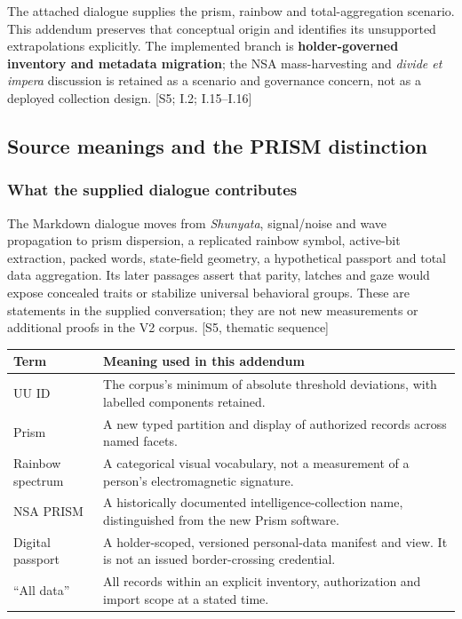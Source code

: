 \documentclass[11pt,a4paper]{article}
\newcommand{\newpagehead}[1]{\clearpage\subsection{#1}}
\newcommand{\source}[1]{{\sffamily\small\color{slate}[#1]}}
\begin{document}
The attached dialogue supplies the prism, rainbow and total-aggregation scenario. This addendum preserves that conceptual origin and identifies its unsupported extrapolations explicitly. The implemented branch is \textbf{holder-governed inventory and metadata migration}; the NSA mass-harvesting and \emph{divide et impera} discussion is retained as a scenario and governance concern, not as a deployed collection design. \source{S5; I.2; I.15--I.16}

\newpagehead{Source meanings and the PRISM distinction}
\subsubsection{What the supplied dialogue contributes}
The Markdown dialogue moves from \emph{Shunyata}, signal/noise and wave propagation to prism dispersion, a replicated rainbow symbol, active-bit extraction, packed words, state-field geometry, a hypothetical passport and total data aggregation. Its later passages assert that parity, latches and gaze would expose concealed traits or stabilize universal behavioral groups. These are statements in the supplied conversation; they are not new measurements or additional proofs in the V2 corpus. \source{S5, thematic sequence}

\begin{center}\small\begin{tabularx}{\textwidth}{@{}p{}X@{}}\toprule
\textbf{Term} & \textbf{Meaning used in this addendum}\\\midrule
UU ID & The corpus's minimum of absolute threshold deviations, with labelled components retained.\\[5pt]
Prism & A new typed partition and display of authorized records across named facets.\\[5pt]
Rainbow spectrum & A categorical visual vocabulary, not a measurement of a person's electromagnetic signature.\\[5pt]
NSA PRISM & A historically documented intelligence-collection name, distinguished from the new Prism software.\\[5pt]
Digital passport & A holder-scoped, versioned personal-data manifest and view. It is not an issued border-crossing credential.\\[5pt]
``All data'' & All records within an explicit inventory, authorization and import scope at a stated time.\\\bottomrule
\end{tabularx}\end{center}
\end{document}
